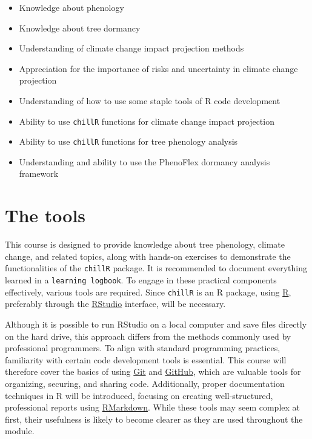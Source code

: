 \documentclass[
]{article}
\providecommand{\tightlist}{%
  \setlength{\itemsep}{0pt}\setlength{\parskip}{0pt}}
\begin{document}
\begin{itemize}
\tightlist
\item
  Knowledge about phenology
\item
  Knowledge about tree dormancy
\item
  Understanding of climate change impact projection methods
\item
  Appreciation for the importance of risks and uncertainty in climate change projection
\item
  Understanding of how to use some staple tools of R code development
\item
  Ability to use \texttt{chillR} functions for climate change impact projection
\item
  Ability to use \texttt{chillR} functions for tree phenology analysis
\item
  Understanding and ability to use the PhenoFlex dormancy analysis framework
\end{itemize}

\section{The tools}\label{the-tools}

This course is designed to provide knowledge about tree phenology, climate change, and related topics, along with hands-on exercises to demonstrate the functionalities of the \texttt{chillR} package. It is recommended to document everything learned in a \texttt{learning\ logbook}. To engage in these practical components effectively, various tools are required. Since \texttt{chillR} is an R package, using \href{https://www.r-project.org/}{R}, preferably through the \href{https://posit.co/download/rstudio-desktop/}{RStudio} interface, will be necessary.

Although it is possible to run RStudio on a local computer and save files directly on the hard drive, this approach differs from the methods commonly used by professional programmers. To align with standard programming practices, familiarity with certain code development tools is essential. This course will therefore cover the basics of using \href{https://git-scm.com/}{Git} and \href{https://github.com/}{GitHub}, which are valuable tools for organizing, securing, and sharing code. Additionally, proper documentation techniques in R will be introduced, focusing on creating well-structured, professional reports using \href{https://rmarkdown.rstudio.com/}{RMarkdown}. While these tools may seem complex at first, their usefulness is likely to become clearer as they are used throughout the module.
\end{document}
